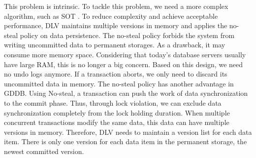\documentclass[conference]{IEEEtran}
\begin{document}
This problem is intrinsic.
To tackle this problem, we need a more complex algorithm, such as SOT \cite{UnifyCR:journals/is/AlonsoVABASW94}.
To reduce complexity and achieve acceptable performance, DLV maintains multiple versions in memory and applies the no-steal policy on data persistence.
The no-steal policy forbids the system from writing uncommitted data to permanent storages.
As a drawback, it may consume more memory space.
Considering that today's database servers usually have large RAM, this is no longer a big concern.
Based on this design, we need no undo logs anymore. If a transaction aborts, we only need to discard its uncommitted data in memory.
The no-steal policy has another advantage in GDDB.
Using No-steal, a transaction can push the work of data synchronization to the commit phase.
Thus, through lock violation, we can exclude data synchronization completely from the lock holding duration. 
When multiple concurrent transactions modify the same data, this data can have multiple versions in memory.
Therefore, DLV needs to maintain a version list for each data item.
There is only one version for each data item in the permanent storage, the newest committed version.
\end{document}
